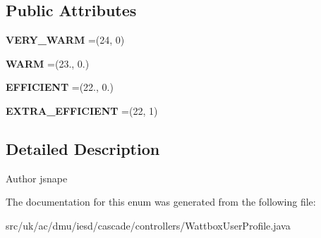 \subsection*{Public Attributes}
\begin{DoxyCompactItemize}
\item 
\hypertarget{enumuk_1_1ac_1_1dmu_1_1iesd_1_1cascade_1_1controllers_1_1_wattbox_user_profile_a790c73f65e17a17f1ef9026978a4ed2d}{{\bfseries V\-E\-R\-Y\-\_\-\-W\-A\-R\-M} =(24, 0)}\label{enumuk_1_1ac_1_1dmu_1_1iesd_1_1cascade_1_1controllers_1_1_wattbox_user_profile_a790c73f65e17a17f1ef9026978a4ed2d}

\item 
\hypertarget{enumuk_1_1ac_1_1dmu_1_1iesd_1_1cascade_1_1controllers_1_1_wattbox_user_profile_a218ebfce43d780deccaab5f074f3ecbe}{{\bfseries W\-A\-R\-M} =(23., 0.)}\label{enumuk_1_1ac_1_1dmu_1_1iesd_1_1cascade_1_1controllers_1_1_wattbox_user_profile_a218ebfce43d780deccaab5f074f3ecbe}

\item 
\hypertarget{enumuk_1_1ac_1_1dmu_1_1iesd_1_1cascade_1_1controllers_1_1_wattbox_user_profile_ad6965ca428b1f8888ef6ec3764ec3d72}{{\bfseries E\-F\-F\-I\-C\-I\-E\-N\-T} =(22., 0.)}\label{enumuk_1_1ac_1_1dmu_1_1iesd_1_1cascade_1_1controllers_1_1_wattbox_user_profile_ad6965ca428b1f8888ef6ec3764ec3d72}

\item 
\hypertarget{enumuk_1_1ac_1_1dmu_1_1iesd_1_1cascade_1_1controllers_1_1_wattbox_user_profile_af98ec9759c95ec9425dc2e2294887514}{{\bfseries E\-X\-T\-R\-A\-\_\-\-E\-F\-F\-I\-C\-I\-E\-N\-T} =(22, 1)}\label{enumuk_1_1ac_1_1dmu_1_1iesd_1_1cascade_1_1controllers_1_1_wattbox_user_profile_af98ec9759c95ec9425dc2e2294887514}

\end{DoxyCompactItemize}


\subsection{Detailed Description}
\begin{DoxyAuthor}{Author}
jsnape 
\end{DoxyAuthor}


The documentation for this enum was generated from the following file\-:\begin{DoxyCompactItemize}
\item 
src/uk/ac/dmu/iesd/cascade/controllers/Wattbox\-User\-Profile.\-java\end{DoxyCompactItemize}
